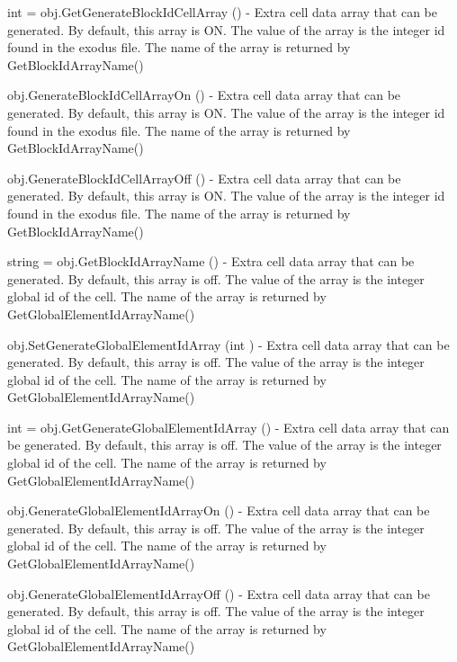 \begin{DoxyItemize}
\item {\ttfamily int = obj.\-Get\-Generate\-Block\-Id\-Cell\-Array ()} -\/ Extra cell data array that can be generated. By default, this array is O\-N. The value of the array is the integer id found in the exodus file. The name of the array is returned by Get\-Block\-Id\-Array\-Name()  
\item {\ttfamily obj.\-Generate\-Block\-Id\-Cell\-Array\-On ()} -\/ Extra cell data array that can be generated. By default, this array is O\-N. The value of the array is the integer id found in the exodus file. The name of the array is returned by Get\-Block\-Id\-Array\-Name()  
\item {\ttfamily obj.\-Generate\-Block\-Id\-Cell\-Array\-Off ()} -\/ Extra cell data array that can be generated. By default, this array is O\-N. The value of the array is the integer id found in the exodus file. The name of the array is returned by Get\-Block\-Id\-Array\-Name()  
\item {\ttfamily string = obj.\-Get\-Block\-Id\-Array\-Name ()} -\/ Extra cell data array that can be generated. By default, this array is off. The value of the array is the integer global id of the cell. The name of the array is returned by Get\-Global\-Element\-Id\-Array\-Name()  
\item {\ttfamily obj.\-Set\-Generate\-Global\-Element\-Id\-Array (int )} -\/ Extra cell data array that can be generated. By default, this array is off. The value of the array is the integer global id of the cell. The name of the array is returned by Get\-Global\-Element\-Id\-Array\-Name()  
\item {\ttfamily int = obj.\-Get\-Generate\-Global\-Element\-Id\-Array ()} -\/ Extra cell data array that can be generated. By default, this array is off. The value of the array is the integer global id of the cell. The name of the array is returned by Get\-Global\-Element\-Id\-Array\-Name()  
\item {\ttfamily obj.\-Generate\-Global\-Element\-Id\-Array\-On ()} -\/ Extra cell data array that can be generated. By default, this array is off. The value of the array is the integer global id of the cell. The name of the array is returned by Get\-Global\-Element\-Id\-Array\-Name()  
\item {\ttfamily obj.\-Generate\-Global\-Element\-Id\-Array\-Off ()} -\/ Extra cell data array that can be generated. By default, this array is off. The value of the array is the integer global id of the cell. The name of the array is returned by Get\-Global\-Element\-Id\-Array\-Name()  

\end{DoxyItemize}
